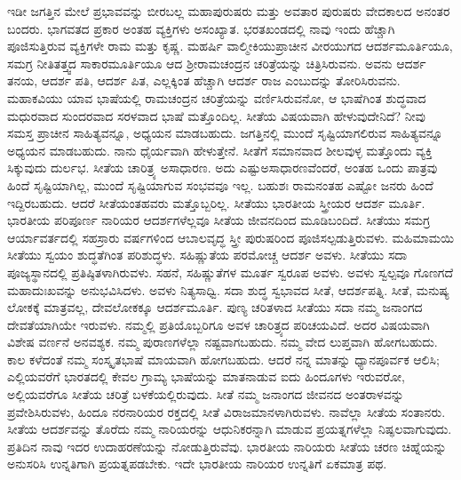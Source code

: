 ಇಡೀ ಜಗತ್ತಿನ ಮೇಲೆ ಪ್ರಭಾವವನ್ನು ಬೀರಬಲ್ಲ ಮಹಾಪುರುಷರು ಮತ್ತು ಅವತಾರ ಪುರುಷರು ವೇದಕಾಲದ ಅನಂತರ ಬಂದರು. ಭಾಗವತದ ಪ್ರಕಾರ ಅಂತಹ ವ್ಯಕ್ತಿಗಳು ಅಸಂಖ್ಯಾತ. ಭರತಖಂಡದಲ್ಲಿ ನಾವು ಇಂದು ಹೆಚ್ಚಾಗಿ ಪೂಜಿಸುತ್ತಿರುವ ವ್ಯಕ್ತಿಗಳೇ ರಾಮ ಮತ್ತು ಕೃಷ್ಣ. ಮಹರ್ಷಿ ವಾಲ್ಮೀಕಿಯುಪ್ರಾಚೀನ ವೀರಯುಗದ ಆದರ್ಶಮೂರ್ತಿಯೂ, ಸಮಗ್ರ ನೀತಿತತ್ತ್ವದ ಸಾಕಾರಮೂರ್ತಿಯೂ ಆದ ಶ‍್ರೀರಾಮಚಂದ್ರನ ಚರಿತ್ರೆಯನ್ನು ಚಿತ್ರಿಸಿರುವನು. ಅವನು ಆದರ್ಶ ತನಯ, ಆದರ್ಶ ಪತಿ, ಆದರ್ಶ ಪಿತ, ಎಲ್ಲಕ್ಕಿಂತ ಹೆಚ್ಚಾಗಿ ಆದರ್ಶ ರಾಜ ಎಂಬುದನ್ನು ತೋರಿಸಿರುವನು. ಮಹಾಕವಿಯು ಯಾವ ಭಾಷೆಯಲ್ಲಿ ರಾಮಚಂದ್ರನ ಚರಿತ್ರೆಯನ್ನು ವರ್ಣಿಸಿರುವನೋ, ಆ ಭಾಷೆಗಿಂತ ಶುದ್ಧವಾದ ಮಧುರವಾದ ಸುಂದರವಾದ ಸರಳವಾದ ಭಾಷೆ ಮತ್ತೊಂದಿಲ್ಲ. ಸೀತೆಯ ವಿಷಯವಾಗಿ ಹೇಳುವುದೇನಿದೆ? ನೀವು ಸಮಸ್ತ ಪ್ರಾಚೀನ ಸಾಹಿತ್ಯವನ್ನೂ, ಅಧ್ಯಯನ ಮಾಡಬಹುದು. ಜಗತ್ತಿನಲ್ಲಿ ಮುಂದೆ ಸೃಷ್ಟಿಯಾಗಲಿರುವ ಸಾಹಿತ್ಯವನ್ನೂ ಅಧ್ಯಯನ ಮಾಡಬಹುದು. ನಾನು ಧೈರ್ಯವಾಗಿ ಹೇಳುತ್ತೇನೆ. ಸೀತೆಗೆ ಸಮಾನವಾದ ಶೀಲವುಳ್ಳ ಮತ್ತೊಂದು ವ್ಯಕ್ತಿ ಸಿಕ್ಕುವುದು ದುರ್ಲಭ. ಸೀತೆಯ ಚಾರಿತ್ರ್ಯ ಅಸಾಧಾರಣ. ಅದು ಎಷ್ಟು\break ಅಸಾಧಾರಣವೆಂದರೆ, ಅಂತಹ ಒಂದು ಪಾತ್ರವು ಹಿಂದೆ ಸೃಷ್ಟಿಯಾಗಿಲ್ಲ, ಮುಂದೆ ಸೃಷ್ಟಿಯಾಗುವ ಸಂಭವವೂ ಇಲ್ಲ. ಬಹುಶಃ ರಾಮನಂತಹ ಎಷ್ಟೋ ಜನರು ಹಿಂದೆ ಇದ್ದಿರಬಹುದು. ಆದರೆ ಸೀತೆಯಂತಹವರು ಮತ್ತೊಬ್ಬರಿಲ್ಲ. ಸೀತೆಯು ಭಾರತೀಯ ಸ್ತ್ರೀಯರ ಆದರ್ಶ ಮೂರ್ತಿ. ಭಾರತೀಯ ಪರಿಪೂರ್ಣ ನಾರಿಯರ ಆದರ್ಶಗಳೆಲ್ಲವೂ ಸೀತೆಯ ಜೀವನದಿಂದ ಮೂಡಿಬಂದಿದೆ. ಸೀತೆಯು ಸಮಗ್ರ ಆರ್ಯಾವರ್ತದಲ್ಲಿ ಸಹಸ್ರಾರು ವರ್ಷಗಳಿಂದ ಆಬಾಲವೃದ್ಧ ಸ್ತ್ರೀ ಪುರುಷರಿಂದ ಪೂಜಿಸಲ್ಪಡುತ್ತಿರುವಳು. ಮಹಿಮಾಮಯಿ ಸೀತೆಯು ಸ್ವಯಂ ಶುದ್ಧತೆಗಿಂತ ಪರಿಶುದ್ಧಳು. ಸಹಿಷ್ಣುತೆಯ ಪರಮೋಚ್ಚ ಆದರ್ಶ ಅವಳು. ಸೀತೆಯು ಸದಾ ಪೂಜ್ಯಸ್ಥಾನದಲ್ಲಿ ಪ್ರತಿಷ್ಠಿತಳಾಗಿರುವಳು. ಸಹನೆ, ಸಹಿಷ್ಣುತೆಗಳ ಮೂರ್ತ ಸ್ವರೂಪ ಅವಳು. ಅವಳು ಸ್ವಲ್ಪವೂ ಗೊಣಗದೆ ಮಹಾದುಃಖವನ್ನು ಅನುಭವಿಸಿದಳು. ಅವಳು ನಿತ್ಯಸಾಧ್ವಿ. ಸದಾ ಶುದ್ಧ ಸ್ವಭಾವದ ಸೀತೆ, ಆದರ್ಶಪತ್ನಿ. ಸೀತೆ, ಮನುಷ್ಯ ಲೋಕಕ್ಕೆ ಮಾತ್ರವಲ್ಲ, ದೇವಲೋಕಕ್ಕೂ ಆದರ್ಶಮೂರ್ತಿ. ಪುಣ್ಯ ಚರಿತಳಾದ ಸೀತೆಯು ಸದಾ ನಮ್ಮ ಜನಾಂಗದ ದೇವತೆಯಾಗಿಯೇ ಇರುವಳು. ನಮ್ಮಲ್ಲಿ ಪ್ರತಿಯೊಬ್ಬರಿಗೂ ಅವಳ ಚಾರಿತ್ರ್ಯದ ಪರಿಚಯವಿದೆ. ಅದರ ವಿಷಯವಾಗಿ ವಿಶೇಷ ವರ್ಣನೆ ಅನವಶ್ಯಕ. ನಮ್ಮ ಪುರಾಣಗಳೆಲ್ಲಾ ನಷ್ಟವಾಗಬಹುದು. ನಮ್ಮ ವೇದ ಲುಪ್ತವಾಗಿ ಹೋಗಬಹುದು. ಕಾಲ ಕಳೆದಂತೆ ನಮ್ಮ ಸಂಸ್ಕೃತಭಾಷೆ ಮಾಯವಾಗಿ ಹೋಗಬಹುದು. ಆದರೆ ನನ್ನ ಮಾತನ್ನು ಧ್ಯಾನಪೂರ್ವಕ ಆಲಿಸಿ; ಎಲ್ಲಿಯವರೆಗೆ ಭಾರತದಲ್ಲಿ ಕೇವಲ ಗ್ರಾಮ್ಯ ಭಾಷೆಯನ್ನು ಮಾತನಾಡುವ ಐದು ಹಿಂದೂಗಳು ಇರುವರೋ, ಅಲ್ಲಿಯವರೆಗೂ ಸೀತೆಯ ಚರಿತ್ರೆ ಬಳಕೆಯಲ್ಲಿರುವುದು. ಸೀತೆ ನಮ್ಮ ಜನಾಂಗದ ಜೀವನದ ಅಂತರಾಳವನ್ನು ಪ್ರವೇಶಿಸಿರುವಳು, ಹಿಂದೂ ನರನಾರಿಯರ ರಕ್ತದಲ್ಲಿ ಸೀತೆ ವಿರಾಜಮಾನಳಾಗಿರುವಳು. ನಾವೆಲ್ಲಾ ಸೀತೆಯ ಸಂತಾನರು. ಸೀತೆಯ ಆದರ್ಶವನ್ನು ತೊರೆದು ನಮ್ಮ ನಾರಿಯರನ್ನು ಆಧುನಿಕರನ್ನಾಗಿ ಮಾಡುವ ಪ್ರಯತ್ನಗಳೆಲ್ಲಾ ನಿಷ್ಫಲವಾಗುವುದು. ಪ್ರತಿದಿನ ನಾವು ಇದರ ಉದಾಹರಣೆಯನ್ನು ನೋಡುತ್ತಿರುವೆವು. ಭಾರತೀಯ ನಾರಿಯರು ಸೀತೆಯ ಚರಣ ಚಿಹ್ನೆಯನ್ನು ಅನುಸರಿಸಿ ಉನ್ನತಿಗಾಗಿ ಪ್ರಯತ್ನಪಡಬೇಕು. ಇದೇ ಭಾರತೀಯ ನಾರಿಯರ ಉನ್ನತಿಗೆ ಏಕಮಾತ್ರ ಪಥ.


